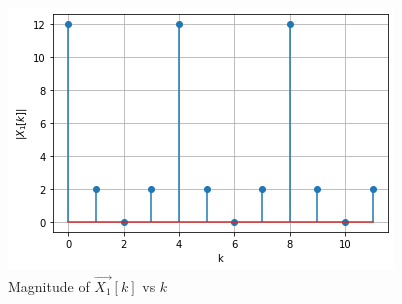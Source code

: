 \documentclass[journal,12pt,twocolumn]{IEEEtran}
\begin{document}
\begin{figure}[!ht]
    \centering
    \includegraphics[width=\columnwidth] {Gate_Assignment_Fig_2.png}
    \caption{Magnitude of $\vec{X_{1}}[k]$ vs $k$}
    \label{Magnitude of X1[k]}
\end{figure}
\end{document}
